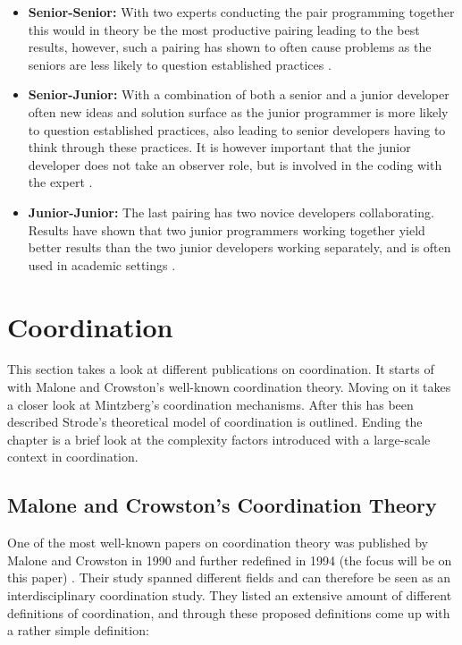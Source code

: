 \begin{itemize}
  \item \textbf{Senior-Senior:} With two experts conducting the pair programming together this would in theory be the most productive pairing leading to the best results, however, such a pairing has shown to often cause problems as the seniors are less likely to question established practices \cite{Lui2006}.
  \item \textbf{Senior-Junior:} With a combination of both a senior and a junior developer often new ideas and solution surface as the junior programmer is more likely to question established practices, also leading to senior developers having to think through these practices. It is however important that the junior developer does not take an observer role, but is involved in the coding with the expert \cite{williams2003pair}.
  \item \textbf{Junior-Junior:} The last pairing has two novice developers collaborating. Results have shown that two junior programmers working together yield better results than the two junior developers working separately, and is often used in academic settings \cite{Cockburn2001}.
\end{itemize}

\section{Coordination}

This section takes a look at different publications on coordination. It starts of with Malone and Crowston's well-known coordination theory. Moving on it takes a closer look at Mintzberg's coordination mechanisms. After this has been described Strode's theoretical model of coordination is outlined. Ending the chapter is a brief look at the complexity factors introduced with a large-scale context in coordination.

\subsection{Malone and Crowston's Coordination Theory}

One of the most well-known papers on coordination theory was published by Malone and Crowston in 1990 and further redefined in 1994 (the focus will be on this paper) \cite{Malone1994}. Their study spanned different fields and can therefore be seen as an interdisciplinary coordination study. They listed an extensive amount of different definitions of coordination, and through these proposed definitions come up with a rather simple definition:

